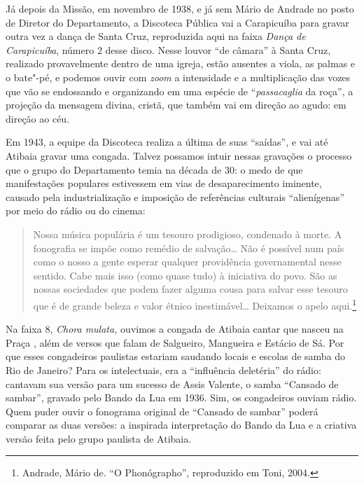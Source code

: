 Já depois da Missão, em novembro de 1938, e já sem Mário de Andrade no
posto de Diretor do Departamento, a Discoteca Pública vai a Carapicuíba
para gravar outra vez a dança de Santa Cruz, reproduzida aqui na faixa
\emph{Dança de Carapicuíba}, número 2 desse disco. Nesse louvor ``de
câmara'' à Santa Cruz, realizado provavelmente dentro de uma igreja,
estão ausentes a viola, as palmas e o bate"-pé, e podemos ouvir com
\emph{zoom} a intensidade e a multiplicação das vozes que vão se
endossando e organizando em uma espécie de ``\emph{passacaglia} da
roça'', a projeção da mensagem divina, cristã, que também vai em direção
ao agudo: em direção ao céu.

Em 1943, a equipe da Discoteca realiza a última de suas ``saídas'', e
vai até Atibaia gravar uma congada. Talvez possamos intuir nessas
gravações o processo que o grupo do Departamento temia na década de 30:
o medo de que manifestações populares estivessem em vias de
desaparecimento iminente, causado pela industrialização e imposição de
referências culturais ``alienígenas'' por meio do rádio ou do cinema:

\begin{quote}
Nossa música populária é um tesouro prodigioso, condenado à morte. A
fonografia se impõe como remédio de salvação\ldots{} Não é possível num
país como o nosso a gente esperar qualquer providência governamental
nesse sentido. Cabe mais isso (como quase tudo) à iniciativa do povo.
São as nossas sociedades que podem fazer alguma cousa para salvar esse
tesouro que é de grande beleza e valor étnico inestimável\ldots{} Deixamos o
apelo aqui.\footnote{Andrade, Mário de. ``O Phonógrapho'',
  reproduzido em Toni, 2004.}
\end{quote}

Na faixa 8, \emph{Chora mulata,} ouvimos a congada de Atibaia cantar que
nasceu na Praça , além de versos que falam de Salgueiro, Mangueira e
Estácio de Sá. Por que esses congadeiros paulistas estariam saudando
locais e escolas de samba do Rio de Janeiro? Para os intelectuais, era a
``influência deletéria'' do rádio: cantavam sua versão para um sucesso
de Assis Valente, o samba ``Cansado de sambar'', gravado pelo Bando da
Lua em 1936. Sim, os congadeiros ouviam rádio. Quem puder ouvir o
fonograma original de ``Cansado de sambar'' poderá comparar as duas
versões: a inspirada interpretação do Bando da Lua e a criativa versão
feita pelo grupo paulista de Atibaia.

